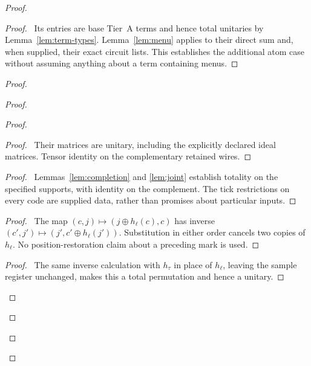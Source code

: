 \begin{proof}
 \begin{proof}\pf\ Its entries are base Tier~A terms and hence total
 unitaries by Lemma~\ref{lem:term-types}. Lemma~\ref{lem:menu}
 applies to their direct sum and, when supplied, their exact circuit
 lists. This establishes the additional atom case without assuming
 anything about a term containing menus.
 \end{proof}
 \begin{proof}
  \begin{proof}
\begin{proof}
 \begin{proof}\pf\ Their matrices are unitary, including the
 explicitly declared ideal matrices. Tensor identity on the
 complementary retained wires.\end{proof}
 \begin{proof}\pf\ Lemmas~\ref{lem:completion} and \ref{lem:joint}
 establish totality on the specified supports, with identity on the
 complement. The tick restrictions on every code are supplied data,
 rather than promises about particular inputs.\end{proof}
 \begin{proof}\pf\ The map $(c,j)\mapsto(j\oplus h_\ell(c),c)$
 has inverse $(c',j')\mapsto(j',c'\oplus h_\ell(j'))$.
 Substitution in either order cancels two copies of $h_\ell$.
 No position-restoration claim about a preceding mark is used.
 \end{proof}
 \begin{proof}\pf\ The same inverse calculation with $h_\tau$
 in place of $h_\ell$, leaving the sample register unchanged,
 makes this a total permutation and hence a unitary.\end{proof}

\end{proof}
\end{proof}
\end{proof}
\end{proof}

